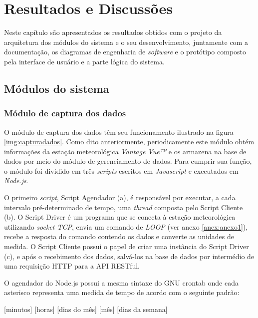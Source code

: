 \chapter{Resultados e Discussões} \label{ch:RD}


Neste capítulo são apresentados os resultados obtidos com o projeto da arquitetura dos módulos do sistema e o seu desenvolvimento, juntamente com a documentação, os diagramas de engenharia de \textit{software} e o protótipo composto pela interface de usuário e a parte lógica do sistema.


\section{Módulos do sistema} \label{subsec:modules}

\subsection{Módulo de captura dos dados} 

O módulo de captura dos dados têm seu funcionamento ilustrado na figura \ref{img:capturadados}. Como dito anteriormente, periodicamente este módulo obtém informações da estação meteorológica \textit{Vantage Vue™} e os armazena na base de dados por meio do módulo de gerenciamento de dados. Para cumprir sua função, o módulo foi dividido em três \textit{scripts} escritos em \textit{Javascript} e executados em \textit{Node.js}. 


O primeiro \textit{script}, Script Agendador (a), é responsável por executar, a cada intervalo pré-determinado de tempo, uma \textit{thread} composta pelo Script Cliente (b). O Script Driver é um programa que se conecta à estação meteorológica utilizando \textit{socket TCP}, envia um comando de \textit{LOOP} (ver anexo \ref{anex:anexo1}), recebe a resposta do comando contendo os dados e converte as unidades de medida. O Script Cliente possui o papel de criar uma instância do Script Driver (c), e após o recebimento dos dados, salvá-los na base de dados por intermédio de uma requisição HTTP para a API RESTful.

O agendador do Node.js possui a mesma sintaxe do GNU crontab \cite{SITEGNUCRONTAB, SITEVIVALINUXCRONTAB, NODECRON} onde cada asterisco representa uma medida de tempo de acordo com o seguinte padrão:
 
\centerline{[minutos] [horas] [dias do mês] [mês] [dias da semana]}

